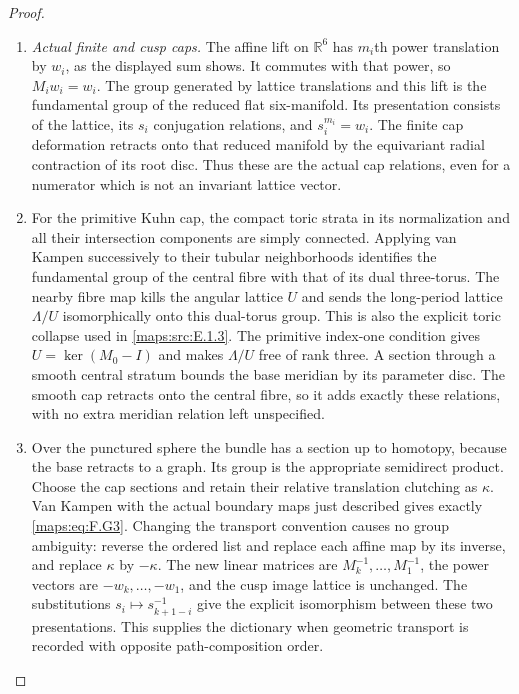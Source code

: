 \begin{proof}
\begin{enumerate}[label=\arabic*.]
\item \emph{Actual finite and cusp caps.}
The affine lift on $\mathbb R^6$ has $m_i$th power translation by
$w_i$, as the displayed sum shows.  It commutes with that power,
so $M_iw_i=w_i$.  The group generated by lattice translations
and this lift is the fundamental group of the reduced flat
six-manifold.  Its presentation consists of the lattice, its
$s_i$ conjugation relations, and $s_i^{m_i}=w_i$.
The finite cap deformation retracts onto that reduced manifold
by the equivariant radial contraction of its root disc.
Thus these are the actual cap relations, even for a numerator
which is not an invariant lattice vector.

\item For the primitive Kuhn cap, the compact toric strata in its
normalization and all their intersection components are simply
connected.  Applying van Kampen successively to their tubular
neighborhoods identifies the fundamental group of the central
fibre with that of its dual three-torus.  The nearby fibre map
kills the angular lattice $U$ and sends the long-period lattice
$\Lambda/U$ isomorphically onto this dual-torus group.  This is
also the explicit toric collapse used in \ref{maps:src:E.1.3}.  The primitive
index-one condition gives $U=\ker(M_0-I)$ and makes $\Lambda/U$
free of rank three.  A section through a smooth central stratum
bounds the base meridian by its parameter disc.  The smooth cap
retracts onto the central fibre, so it adds exactly these
relations, with no extra meridian relation left unspecified.

\item Over the punctured sphere the bundle has a section up to homotopy,
because the base retracts to a graph.  Its group is the appropriate
semidirect product.  Choose the cap sections and retain their
relative translation clutching as $\kappa$.  Van Kampen with the
actual boundary maps just described gives exactly \eqref{maps:eq:F.G3}.
Changing the transport convention causes no group ambiguity:
reverse the ordered list and replace each affine map by its
inverse, and replace $\kappa$ by $-\kappa$.  The new linear
matrices are $M_k^{-1},\ldots,M_1^{-1}$, the power vectors are
$-w_k,\ldots,-w_1$, and the cusp image lattice is unchanged.
The substitutions $s_i\mapsto s_{k+1-i}^{-1}$ give the explicit
isomorphism between these two presentations.  This supplies the
dictionary when geometric transport is recorded with opposite
path-composition order.


\end{enumerate}
\end{proof}
